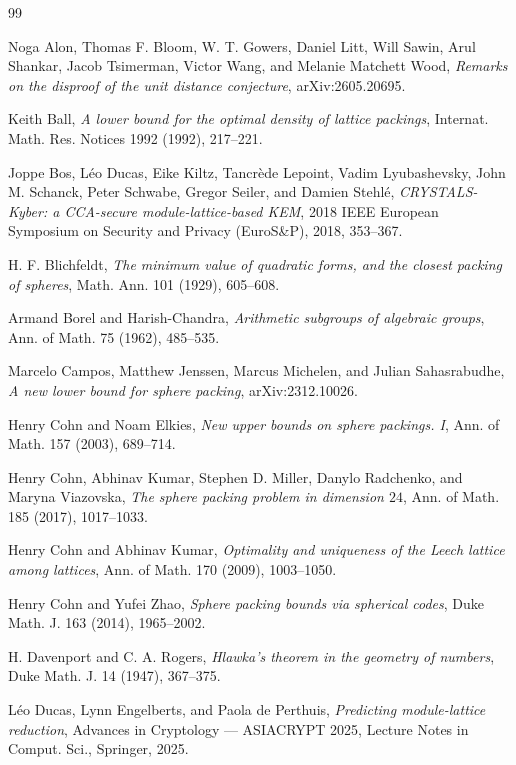 \documentclass[11pt]{article}
\theoremstyle{remark}
\begin{document}
\begin{thebibliography}{99}



Noga Alon, Thomas F. Bloom, W. T. Gowers, Daniel Litt, Will Sawin, Arul
Shankar, Jacob Tsimerman, Victor Wang, and Melanie Matchett Wood,
\emph{Remarks on the disproof of the unit distance conjecture},
arXiv:2605.20695.

Keith Ball,
\emph{A lower bound for the optimal density of lattice packings},
Internat. Math. Res. Notices 1992 (1992), 217--221.

Joppe Bos, L\'eo Ducas, Eike Kiltz, Tancr\`ede Lepoint, Vadim Lyubashevsky,
John M. Schanck, Peter Schwabe, Gregor Seiler, and Damien Stehl\'e,
\emph{CRYSTALS-Kyber: a CCA-secure module-lattice-based KEM},
2018 IEEE European Symposium on Security and Privacy (EuroS\&P), 2018, 353--367.

H. F. Blichfeldt,
\emph{The minimum value of quadratic forms, and the closest packing of spheres},
Math. Ann. 101 (1929), 605--608.

Armand Borel and Harish-Chandra,
\emph{Arithmetic subgroups of algebraic groups},
Ann. of Math. 75 (1962), 485--535.

Marcelo Campos, Matthew Jenssen, Marcus Michelen, and Julian Sahasrabudhe,
\emph{A new lower bound for sphere packing},
arXiv:2312.10026.

Henry Cohn and Noam Elkies,
\emph{New upper bounds on sphere packings. I},
Ann. of Math. 157 (2003), 689--714.

Henry Cohn, Abhinav Kumar, Stephen D. Miller, Danylo Radchenko, and Maryna
Viazovska,
\emph{The sphere packing problem in dimension $24$},
Ann. of Math. 185 (2017), 1017--1033.

Henry Cohn and Abhinav Kumar,
\emph{Optimality and uniqueness of the Leech lattice among lattices},
Ann. of Math. 170 (2009), 1003--1050.

Henry Cohn and Yufei Zhao,
\emph{Sphere packing bounds via spherical codes},
Duke Math. J. 163 (2014), 1965--2002.

H. Davenport and C. A. Rogers,
\emph{Hlawka's theorem in the geometry of numbers},
Duke Math. J. 14 (1947), 367--375.

L\'eo Ducas, Lynn Engelberts, and Paola de Perthuis,
\emph{Predicting module-lattice reduction},
Advances in Cryptology --- ASIACRYPT 2025, Lecture Notes in Comput. Sci.,
Springer, 2025.


\end{thebibliography}
\end{document}
